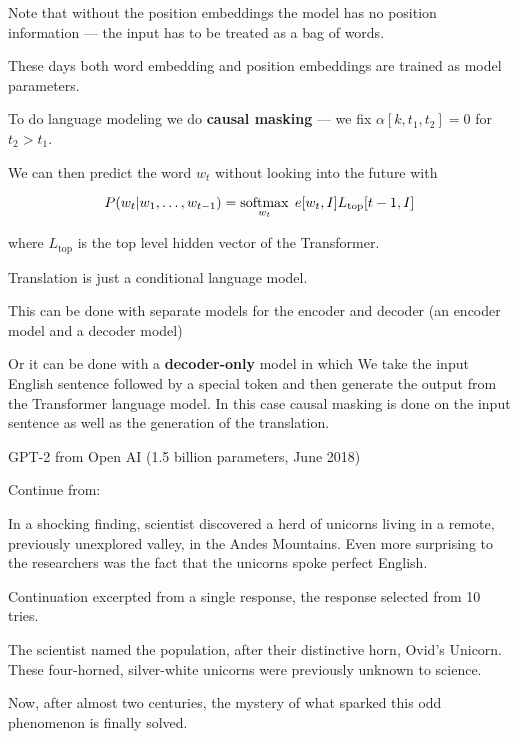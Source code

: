 {\vfill
Note that without the position embeddings the model has no position information --- the input has to be treated as a bag of words.

\vfill
These days both word embedding and position embeddings are trained as model parameters.


To do language modeling we do {\bf causal masking} --- we fix $\alpha[k,t_1,t_2] = 0$ for $t_2 > t_1$.

\vfill
We can then predict the word $w_t$ without looking into the future with

\vfill
$$P(w_t|w_1,\ldots,w_{t-1}) = \operatorname*{softmax}_{w_t}\;e[w_t,I]L_\mathrm{top}[t-1,I]$$

\vfill
where $L_\mathrm{top}$ is the top level hidden vector of the Transformer.


Translation is just a conditional language model.

\vfill
This can be done with separate models for the encoder and decoder (an encoder model and a decoder model)

\vfill
Or it can be done with a {\bf decoder-only} model in which We take the input English sentence followed by a special token and then generate the output from the Transformer  language model.
In this case causal masking is done on the input sentence as well as the generation of the translation.




GPT-2 from Open AI (1.5 billion parameters, June 2018)

\vfill
{\color{red} Continue from:}

\vfill
In a shocking finding, scientist discovered a herd of unicorns living in a remote, previously unexplored valley, in the Andes Mountains. Even more surprising to the researchers was the fact that the unicorns spoke perfect English.


{\color{red} Continuation excerpted from a single response, the response selected from 10 tries.}

\bigskip

The scientist named the population, after their distinctive horn, Ovid’s Unicorn. These four-horned, silver-white unicorns were previously unknown to science.

Now, after almost two centuries, the mystery of what sparked this odd phenomenon is finally solved.

}
